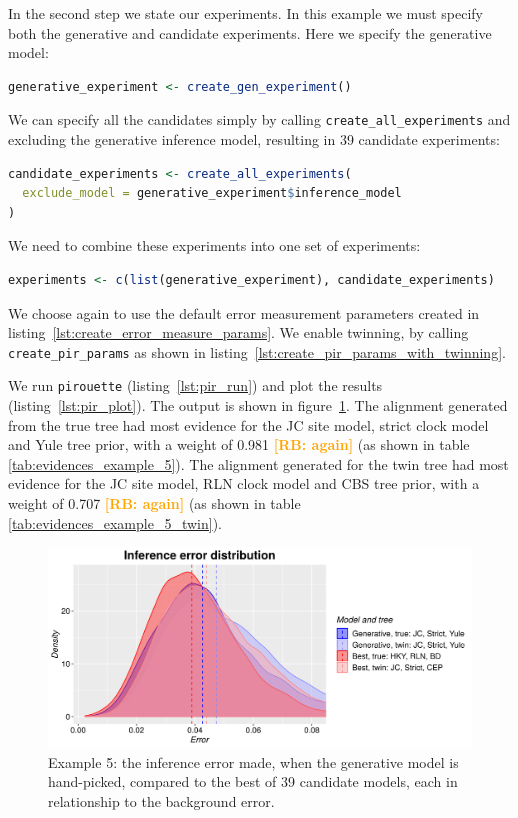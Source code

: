 \documentclass{article}
\newcommand{\richel}[1]{\textcolor{orange}{\textbf{[RB: #1]}}}
\begin{document}
In the second step we state our experiments. 
In this example we must specify both the generative and candidate experiments. 
Here we specify the generative model:

\begin{lstlisting}[language=R, floatplacement=H, frame=single]
generative_experiment <- create_gen_experiment()
\end{lstlisting}

We can specify all the candidates simply by calling 
\verb;create_all_experiments; and excluding the generative inference model,
resulting in 39 candidate experiments:

\begin{lstlisting}[language=R, floatplacement=H, frame=single]
candidate_experiments <- create_all_experiments(
  exclude_model = generative_experiment$inference_model
)
\end{lstlisting}

We need to combine these experiments into one set of experiments:

\begin{lstlisting}[language=R, floatplacement=H, frame=single]
experiments <- c(list(generative_experiment), candidate_experiments)
\end{lstlisting}

We choose again to use the default error measurement parameters
created in listing~\ref{lst:create_error_measure_params}.
We enable twinning, by calling \verb;create_pir_params;
as shown in listing~\ref{lst:create_pir_params_with_twinning}.

We run \verb;pirouette; (listing~\ref{lst:pir_run}) 
and plot the results (listing~\ref{lst:pir_plot}).
The output is shown in figure~\ref{fig:example_5}.
The alignment
generated from the true tree had most evidence for the JC site model,
strict clock model and Yule tree prior, 
with a weight of 0.981 \richel{again} (as 
shown in table \ref{tab:evidences_example_5}). 
The alignment
generated for the twin tree had most evidence for the JC site model,
RLN clock model and CBS tree prior,
with a weight of 0.707 \richel{again} (as 
shown in table \ref{tab:evidences_example_5_twin}). 

\begin{figure}[H]
  \includegraphics[width=\textwidth]{example_5/errors.png}
  \caption{
    Example 5: the inference error made, 
    when the generative model is hand-picked, 
    compared to the best of 39 candidate models, 
    each in relationship to the background error.
  }
  \label{fig:example_5}
\end{figure}
\end{document}
